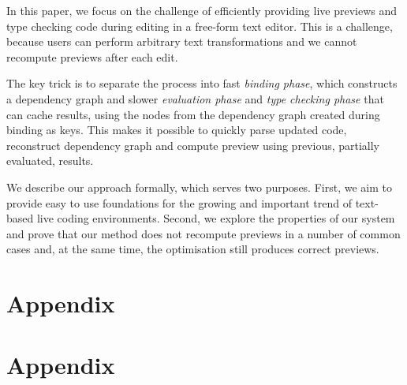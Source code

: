\documentclass[sigplan,10pt]{acmart}\settopmatter{printfolios=true,printccs=false,printacmref=false}
\theoremstyle{plain}
\theoremstyle{definition}
\begin{document}
In this paper, we focus on the challenge of efficiently providing live previews and type checking 
code during editing in a free-form text editor. This is a challenge, because users can perform 
arbitrary text transformations and we cannot recompute previews after each edit.

The key trick is to separate the process into fast \emph{binding phase}, 
which constructs a dependency graph and slower \emph{evaluation phase} and \emph{type checking phase} 
that can cache results, using the nodes from the dependency graph created during binding as keys.
This makes it possible to quickly parse updated code, reconstruct dependency graph and compute
preview using previous, partially evaluated, results.

We describe our approach formally, which serves two purposes. First, we aim to provide easy to
use foundations for the growing and important trend of text-based live coding environments. 
Second, we explore the properties of our system and prove that our method does not recompute 
previews in a number of common cases and, at the same time, the optimisation still produces 
correct previews.



\newpage
\appendix 

\section{Appendix}
\label{sec:app-broadband}

\section{Appendix}
\label{sec:app-correctness}
\end{document}
